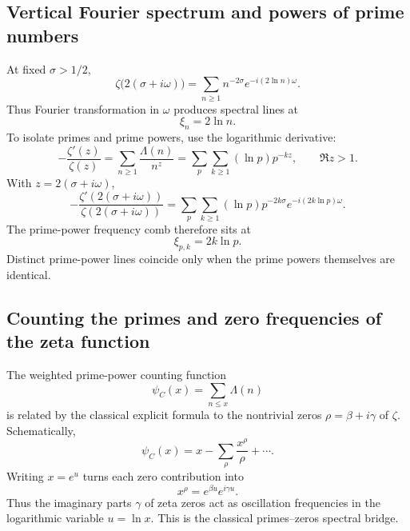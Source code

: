 \subsection{Vertical Fourier spectrum and powers of prime numbers}

At fixed $\sigma>1/2$,
\begin{equation}
 \zeta\bigl(2(\sigma+i\omega)\bigr)
 =\sum_{n\ge1}n^{-2\sigma}e^{-i(2\ln n)\omega}.
 \label{eq:zeta-vertical-fourier}
\end{equation}
Thus Fourier transformation in $\omega$ produces spectral lines at
\begin{equation}
 \xi_n=2\ln n.
\end{equation}
To isolate primes and prime powers, use the logarithmic derivative:
\begin{equation}
 -\frac{\zeta'(z)}{\zeta(z)}
 =\sum_{n\ge1}\frac{\Lambda(n)}{n^z}
 =\sum_p\sum_{k\ge1}(\ln p)p^{-kz},
 \qquad \Re z>1.
 \label{eq:log-derivative-von-mangoldt}
\end{equation}
With $z=2(\sigma+i\omega)$,
\begin{equation}
 -\frac{\zeta'\!\left(2(\sigma+i\omega)\right)}
        {\zeta\!\left(2(\sigma+i\omega)\right)}
 =\sum_p\sum_{k\ge1}
   (\ln p)p^{-2k\sigma}
   e^{-i(2k\ln p)\omega}.
 \label{eq:prime-power-fourier-comb}
\end{equation}
The prime-power frequency comb therefore sits at
\begin{equation}
 \boxed{\xi_{p,k}=2k\ln p.}
 \label{eq:prime-power-frequencies}
\end{equation}
Distinct prime-power lines coincide only when the prime powers themselves are identical.

\subsection{Counting the primes and zero frequencies of the zeta function}

The weighted prime-power counting function
\begin{equation}
 \psi_C(x)=\sum_{n\le x}\Lambda(n)
\end{equation}
is related by the classical explicit formula to the nontrivial zeros
$\rho=\beta+i\gamma$ of $\zeta$.  Schematically,
\begin{equation}
 \psi_C(x)=x-\sum_\rho\frac{x^\rho}{\rho}+\cdots.
 \label{eq:explicit-formula-schematic}
\end{equation}
Writing $x=e^u$ turns each zero contribution into
\begin{equation}
 x^\rho=e^{\beta u}e^{i\gamma u}.
\end{equation}
Thus the imaginary parts $\gamma$ of zeta zeros act as oscillation frequencies in the
logarithmic variable $u=\ln x$.  This is the classical primes--zeros spectral bridge.

